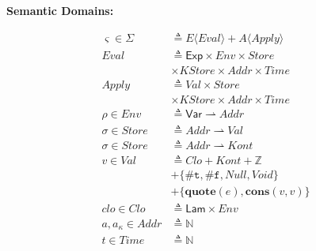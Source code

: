 \documentclass[12pt,draft]{article}
\newcommand{\truesyn}{\texttt{\#t}}
\newcommand{\falsesyn}{\texttt{\#f}}
\begin{document}
{\begin{multicols*}{2}
\vfill\null
\columnbreak


\begin{center}
\textbf{Semantic Domains:}
\end{center}
\vspace{-18mm}
\begin{center}
\begin{align*}
\varsigma \in \Sigma &\triangleq E\langle\textit{Eval}\rangle
								+ A\langle\textit{Apply}\rangle \\
  \textit{Eval} &\triangleq
                  \textsf{Exp} \times \textit{Env} \times \textit{Store} \\
                     & \times \textit{KStore} \times \textit{Addr} \times \textit{Time} \\
  \textit{Apply} &\triangleq
                   \textit{Val} \times \textit{Store} \\
                     & \times \textit{KStore} \times \textit{Addr} \times \textit{Time} \\
  \rho \in \textit{Env} &\triangleq \textsf{Var} \rightharpoonup
	  											\textit{Addr} \\
  \sigma \in \textit{Store} &\triangleq \textit{Addr} \rightharpoonup
                              \textit{Val} \\
  \sigma \in \textit{Store} &\triangleq \textit{Addr} \rightharpoonup
                              \textit{Kont} \\
v \in \textit{Val} &\triangleq \textit{Clo} + \textit{Kont} + \mathbb{Z} \\
				&+ \{ \truesyn,\falsesyn, \textit{Null} , \textit{Void} \} \\
				&+ \{\textbf{quote}(e) , \textbf{cons}(v, v)\} \\
clo \in \textit{Clo} &\triangleq \textsf{Lam} \times \textit{Env} \\
a, a_\kappa \in \textit{Addr} &\triangleq \mathbb{N} \\
t \in \textit{Time} &\triangleq \mathbb{N} \\

\end{align*}
\end{center}
\end{multicols*}}
\end{document}

